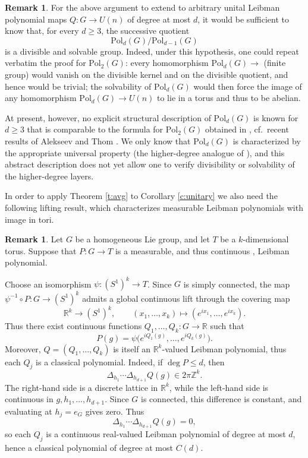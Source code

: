 \documentclass[12pt,reqno,a4paper,dvipsnames]{amsart}
\theoremstyle{plain}
\theoremstyle{definition}
\newtheorem{remark}[theorem]{Remark}
\numberwithin{theorem}{section}
\numberwithin{equation}{section}
\begin{document}
\begin{remark}\label{higher-degree}
For the above argument to extend to arbitrary unital Leibman polynomial maps 
$Q \colon G \to U(n)$ of degree at most $d$, it would be sufficient to know that, 
for every $d \ge 3$, the successive quotient 
\[
    \mathrm{Pol}_d(G) \big/ \mathrm{Pol}_{d-1}(G)
\]
is a divisible and solvable group.  
Indeed, under this hypothesis, one could repeat verbatim the proof for $\mathrm{Pol}_2(G)$:
every homomorphism $\mathrm{Pol}_d(G)\to$ (finite group) would vanish on the divisible kernel and on the divisible quotient, and hence would be trivial; the solvability of $\mathrm{Pol}_d(G)$ would then force the image of any homomorphism $\mathrm{Pol}_d(G)\to U(n)$ to lie in a torus and thus to be abelian.

At present, however, no explicit structural description of $\mathrm{Pol}_d(G)$ is known for $d\ge 3$ that is comparable to the formula for $\mathrm{Pol}_2(G)$ obtained in 
\cite[Theorem~1.3]{quadratic}, cf.~recent results of Alekseev and Thom \cite{at}.   
We only know that $\mathrm{Pol}_d(G)$ is characterized by the appropriate universal property (the higher-degree analogue of \cite[Theorem~1.2]{quadratic}), and this abstract description does not yet allow one to verify divisibility or solvability of the higher-degree layers.
\end{remark}

In order to apply Theorem \ref{t:avg} to Corollary \ref{c:unitary} we also need the following lifting result, which characterizes measurable Leibman polynomials with image in tori.

\begin{remark}\label{rem:lifting}
Let $G$ be a homogeneous Lie group, and let $T$ be a $k$-dimensional torus. Suppose that $P:G\to T$ is a measurable, and thus continuous \cite{auto-cont}, Leibman polynomial.

Choose an isomorphism $\psi:(S^1)^k\to T$. Since $G$ is simply connected, the map
$\psi^{-1} \circ P:G\to (S^1)^k$ admits a global continuous lift through the covering map
$$
    \mathbb R^k\to (S^1)^k,\qquad
    (x_1,\dots,x_k)\mapsto (e^{ix_1},\dots,e^{ix_k}).
$$
Thus there exist continuous functions $Q_1,\dots,Q_k:G\to \mathbb R$ such that
$$
    P(g)
    =
    \psi\bigl(e^{iQ_1(g)},\dots,e^{iQ_k(g)}\bigr).
$$
Moreover, $Q=(Q_1,\dots,Q_k)$ is itself an $\mathbb R^k$-valued Leibman polynomial, thus each $Q_j$ is a classical polynomial. 
Indeed, if $\deg P\leq d$, then
$$
    \Delta_{h_1}\cdots \Delta_{h_{d+1}}Q(g)
    \in 2\pi\mathbb Z^k.
$$
The right-hand side is a discrete lattice in $\mathbb R^k$, while the left-hand side is
continuous in $g,h_1,\dots,h_{d+1}$. Since $G$ is connected, this difference is constant,
and evaluating at $h_j=e_G$ gives zero. Thus
$$
    \Delta_{h_1}\cdots \Delta_{h_{d+1}}Q(g)=0,
$$
so each $Q_j$ is a continuous real-valued Leibman polynomial of degree at most $d$, hence a classical polynomial of degree at most $C(d)$.
\end{remark}
\end{document}
